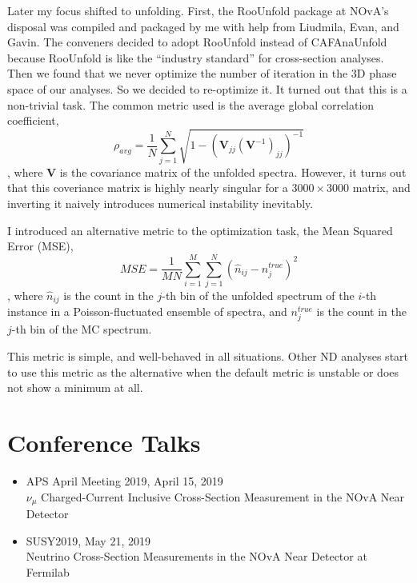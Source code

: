 \documentclass[]{report}   %
\begin{document}
Later my focus shifted to unfolding. First, the RooUnfold package at NOvA's disposal was compiled and packaged by me with help from Liudmila, Evan, and Gavin. The conveners decided to adopt RooUnfold instead of CAFAnaUnfold because RooUnfold is like the ``industry standard'' for cross-section analyses. Then we found that we never optimize the number of iteration in the 3D phase space of our analyses. So we decided to re-optimize it. It turned out that this is a non-trivial task. The common metric used is the average global correlation coefficient,
\begin{equation}
  \rho_{avg}=\frac{1}{N}\sum_{j=1}^N \sqrt{1-(\bm{V}_{jj}(\bm{V}^{-1})_{jj})^{-1}}
\end{equation}
, where $\bm{V}$ is the covariance matrix of the unfolded spectra. However, it turns out that this coveriance matrix is highly nearly singular for a $3000\times 3000$ matrix, and inverting it naively introduces numerical instability inevitably.

I introduced an alternative metric to the optimization task, the Mean Squared Error (MSE),
\begin{equation}
  MSE=\frac{1}{MN}\sum_{i=1}^M \sum_{j=1}^N (\hat{n}_{ij}-n^{true}_j)^2
\end{equation}
, where $\hat{n}_{ij}$ is the count in the $j$-th bin of the unfolded spectrum of the $i$-th instance in a Poisson-fluctuated ensemble of spectra, and $n^{true}_j$ is the count in the $j$-th bin of the MC spectrum.

This metric is simple, and well-behaved in all situations. Other ND analyses start to use this metric as the alternative when the default metric is unstable or does not show a minimum at all.

\section*{Conference Talks}
\begin{itemize}
  \item APS April Meeting 2019, April 15, 2019 \\
        $\nu_\mu$ Charged-Current Inclusive Cross-Section Measurement in the NOvA Near Detector
  \item SUSY2019, May 21, 2019 \\
        Neutrino Cross-Section Measurements in the NOvA Near Detector at Fermilab
\end{itemize}
\end{document}
